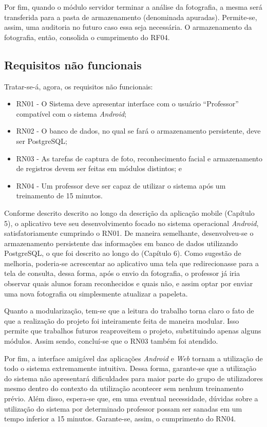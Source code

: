Por fim, quando o módulo servidor terminar a análise da fotografia, a mesma será transferida para a pasta de armazenamento (denominada apuradas). Permite-se, assim, uma auditoria no futuro caso essa seja necessária. O armazenamento da fotografia, então, consolida o cumprimento do RF04.

\subsection{Requisitos não funcionais}
Tratar-se-á, agora, os requisitos não funcionais:
\begin{itemize}
\item RN01 - O Sistema deve apresentar interface com o usuário “Professor” compatível com o sistema \textit{Android}; 
\item RN02 - O banco de dados, no qual se fará o armazenamento persistente, deve ser PostgreSQL; 
\item RN03 - As tarefas de captura de foto, reconhecimento facial e armazenamento de registros devem ser feitas em módulos distintos; e
\item RN04 - Um professor deve ser capaz de utilizar o sistema após um treinamento de 15 minutos.
\end{itemize}

Conforme descrito descrito ao longo da descrição da aplicação mobile (Capítulo 5), o aplicativo teve seu desenvolvimento focado no sistema operacional \textit{Android}, satisfatoriamente cumprindo o RN01. De maneira semelhante, desenvolveu-se o armazenamento persistente das informações em banco de dados utilizando PostgreSQL, o que foi descrito ao longo do (Capítulo 6). Como sugestão de melhoria, poderia-se acrescentar ao aplicativo uma tela que redirecionasse para a tela de consulta, dessa forma, após o envio da fotografia, o professor já iria observar quais alunos foram reconhecidos e quais não, e assim optar por enviar uma nova fotografia ou simplesmente atualizar a papeleta.

Quanto a modularização, tem-se que a leitura do trabalho torna claro o fato de que a realização do projeto foi inteiramente feita de maneira modular. Isso permite que trabalhos futuros reaproveitem o projeto, substituindo apenas alguns módulos. Assim sendo, concluí-se que o RN03 também foi atendido.

Por fim, a interface amigável das aplicações \textit{Android} e \textit{Web} tornam a utilização de todo o sistema extremamente intuitiva. Dessa forma, garante-se que a utilização do sistema não apresentará dificuldades para maior parte do grupo de utilizadores mesmo dentro do contexto da utilização acontecer sem nenhum treinamento prévio. Além disso, espera-se que, em uma eventual necessidade, dúvidas sobre a utilização do sistema por determinado professor possam ser sanadas em um tempo inferior a 15 minutos. Garante-se, assim, o cumprimento do RN04.

